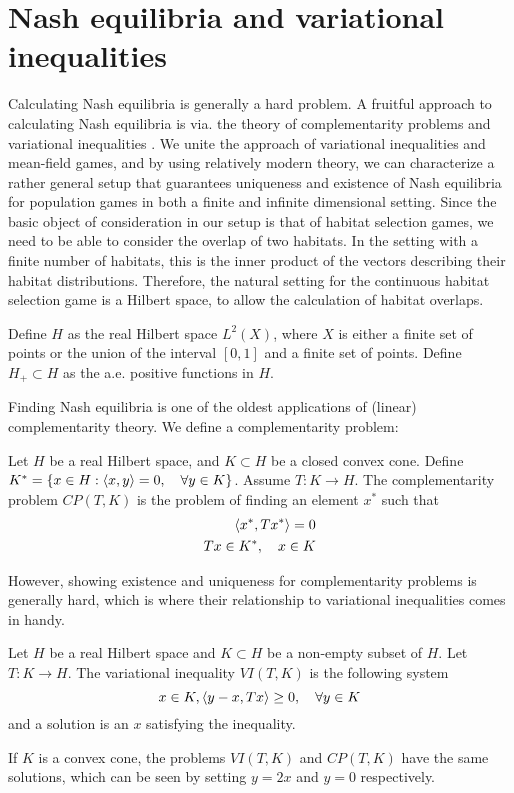 \section{Nash equilibria and variational inequalities}
Calculating Nash equilibria is generally a hard problem. A fruitful approach to calculating Nash equilibria is via. the theory of complementarity problems and variational inequalities \citep{karamardian1969nonlinear,nabetani2011parametrized}. We unite the approach of variational inequalities and mean-field games, and by using relatively modern theory, we can characterize a rather general setup that guarantees uniqueness and existence of Nash equilibria for population games in both a finite and infinite dimensional setting. Since the basic object of consideration in our setup is that of habitat selection games, we need to be able to consider the overlap of two habitats. In the setting with a finite number of habitats, this is the inner product of the vectors describing their habitat distributions. Therefore, the natural setting for the continuous habitat selection game is a Hilbert space, to allow the calculation of habitat overlaps.
\begin{definition}
  Define $H$ as the real Hilbert space $L^2(X)$, where $X$ is either a finite set of points or the union of the interval $[0,1]$ and a finite set of points. Define $H_+ \subset H$ as the a.e. positive functions in $H$.
\end{definition}
Finding Nash equilibria is one of the oldest applications of (linear) complementarity theory. We define a complementarity problem:
\begin{definition}
  Let $H$ be a real Hilbert space, and $K \subset H$ be a closed convex cone. Define $K^* = \{ x \in H : \left \langle x,y \right \rangle = 0, \quad \forall y\in K\} $. Assume $T:K \to H$. The complementarity problem $CP(T,K)$ is the problem of finding an element $x^*$ such that
  \begin{equation}
    \begin{split}
    \left \langle x^*,Tx^* \right \rangle = 0 \\
    Tx \in K^*, \quad  x\in K
  \end{split}
  \end{equation}
\end{definition}
However, showing existence and uniqueness for complementarity problems is generally hard, which is where their relationship to variational inequalities comes in handy.
\begin{definition}
  Let $H$ be a real Hilbert space and $K\subset H$ be a non-empty subset of $H$. Let $T: K \to H$. The variational inequality $VI(T,K)$ is the following system
  \begin{equation}
    x \in K, \left \langle y-x,Tx \right \rangle \geq 0, \quad \forall y \in K
  \end{equation}
  and a solution is an $x$ satisfying the inequality.
\end{definition}
If $K$ is a convex cone, the problems $VI(T,K)$ and $CP(T,K)$ have the same solutions, which can be seen by setting $y=2x$ and $y=0$ respectively.

